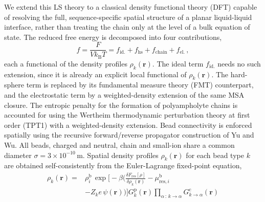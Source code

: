 \documentclass[journal=amlccd,manuscript=article,layout=twocolumn]{achemso}
\begin{document}
We extend this LS theory to a classical density functional theory\cite{jiangMicroscopicInsightsElectrochemical2013,jiangDensityFunctionalTheory2011,gallegosHierarchicalModelWeak2023,gallegosThermodynamicNonidealityCharge2021,gallegosIsingDensityFunctional2021,jiangDensityFunctionalTheory2018} (DFT) capable of resolving the full, sequence-specific spatial structure of a planar liquid-liquid interface, rather than treating the chain only at the level of a bulk equation of state. The reduced free energy is decomposed into four contributions,
\begin{equation}
    f = \frac{F}{Vk_\mathrm{B}T} = f_\mathrm{id.} + f_\mathrm{hs} + f_\mathrm{chain} + f_\mathrm{el.}\,,
    \label{eq:four-terms}
\end{equation}
each a functional of the density profiles $\rho_k(\mathbf{r})$. The ideal term $f_\mathrm{id.}$ needs no such extension, since it is already an explicit local functional of $\rho_k(\mathbf{r})$. The hard-sphere term is replaced by its fundamental measure theory (FMT) counterpart\cite{rosenfeldFreeenergyModelInhomogeneous1989,yuStructuresHardsphereFluids2002}, and the electrostatic term by a weighted-density extension of the same MSA closure\cite{jiangDensityFunctionalTheory2018}. The entropic penalty for the formation of polyampholyte chains is accounted for using the Wertheim thermodynamic perturbation theory at first order (TPT1) with a weighted-density extension\cite{jiangThermodynamicPropertiesPhase2001,wertheimFluidsHighlyDirectional1984,wertheimFluidsHighlyDirectional1984a,wertheimFluidsHighlyDirectional1986,wertheimFluidsHighlyDirectional1986a}. Bead connectivity is enforced spatially using the recursive forward/reverse propagator construction of Yu and Wu\cite{yuDensityFunctionalTheory2002}. All beads, charged and neutral, chain and small-ion share a common diameter $\sigma=3\times10^{-10}\,\mathrm{m}$. Spatial density profiles $\rho_k(\mathbf{r})$ for each bead type $k$ are obtained self-consistently from the Euler-Lagrange fixed-point equation,
\begin{align}
    \rho_k(\mathbf{r}) = &\rho_i^\mathrm{b}\,\nonumber
    \exp\!\Bigg[-\beta\Bigg(\frac{\delta F_\mathrm{res}[\rho]}{\delta\rho_k(\mathbf{r})} - \mu_{\mathrm{res},i}^\mathrm{b} \\&- Z_k e\,\psi(\mathbf{r})\Bigg)\Bigg]
    G_k^\mathrm{p}(\mathbf{r})\!\!\prod_{\alpha\,:\,k\to\alpha}\!\! G_{k\to\alpha}^\mathrm{c}(\mathbf{r}) 
    \label{eq:fixedpoint}
\end{align}
\end{document}
